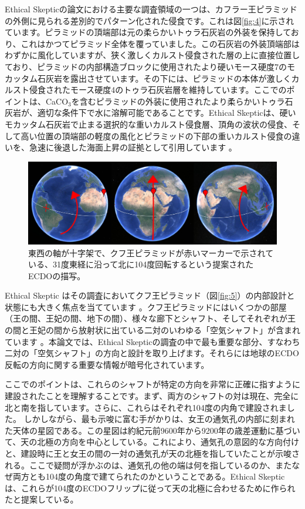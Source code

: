 \documentclass[10pt,twocolumn,letterpaper]{article}
\begin{document}
Ethical Skepticの論文における主要な調査領域の一つは、カフラー王ピラミッドの外側に見られる差別的でパターン化された侵食です。これは図\ref{fig:4}に示されています。ピラミッドの頂端部は元の柔らかいトゥラ石灰岩の外装を保持しており、これはかつてピラミッド全体を覆っていました。この石灰岩の外装頂端部はわずかに風化していますが、狭く激しくカルスト侵食された層の上に直接位置しており、ピラミッドの内部構造ブロックに使用されたより硬いモース硬度7のモカッタム石灰岩を露出させています。その下には、ピラミッドの本体が激しくカルスト侵食されたモース硬度4のトゥラ石灰岩層を維持しています。ここでのポイントは、CaCO$_3$を含むピラミッドの外装に使用されたより柔らかいトゥラ石灰岩が、適切な条件下で水に溶解可能であることです。Ethical Skepticは、硬いモカッタム石灰岩で止まる選択的な重いカルスト侵食層、頂角の波状の侵食、そして高い位置の頂端部の軽度の風化とピラミッドの下部の重いカルスト侵食の違いを、急速に後退した海面上昇の証拠として引用しています \cite{27}。

\begin{figure}[t]
\begin{center}
\includegraphics[width=1\textwidth]{drawing.jpg}
\end{center}
   \caption{東西の軸が十字架で、クフ王ピラミッドが赤いマーカーで示されている、31度東経に沿って北に104度回転するという提案されたECDOの描写。}
\label{fig:6}
\end{figure}

Ethical Skeptic はその調査においてクフ王ピラミッド（図\ref{fig:5}）の内部設計と状態にも大きく焦点を当てています \cite{28}。クフ王ピラミッドにはいくつかの部屋（王の間、王妃の間、地下の間）、様々な廊下とシャフト、そしてそれぞれが王の間と王妃の間から放射状に出ている二対のいわゆる「空気シャフト」が含まれています \cite{29,30}。本論文では、Ethical Skepticの調査の中で最も重要な部分、すなわち二対の「空気シャフト」の方向と設計を取り上げます。それらには地球のECDO反転の方向に関する重要な情報が暗号化されています。

ここでのポイントは、これらのシャフトが特定の方向を非常に正確に指すように建設されたことを理解することです。まず、両方のシャフトの対は現在、完全に北と南を指しています。さらに、これらはそれぞれ104度の内角で建設されました。
しかしながら、最も示唆に富む手がかりは、女王の通気孔の内部に刻まれた天体の星図である。この星図は約紀元前9600年から9200年の歳差運動に基づいて、天の北極の方向を中心としている\cite{28}。これにより、通気孔の意図的な方向付けと、建設時に王と女王の間の一対の通気孔が天の北極を指していたことが示唆される。ここで疑問が浮かぶのは、通気孔の他の端は何を指しているのか、またなぜ両方とも104度の角度で建てられたのかということである。Ethical Skepticは、これらが104度のECDOフリップに従って天の北極に合わせるために作られたと提案している。
\end{document}
